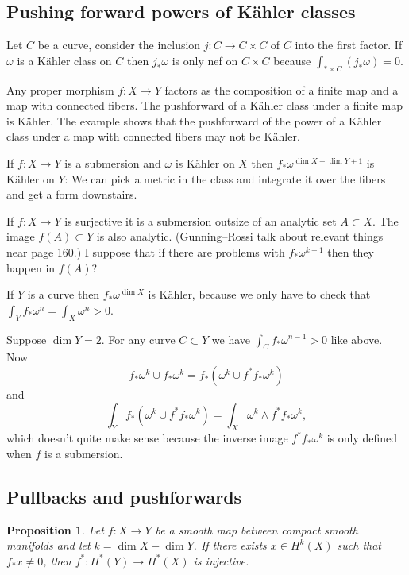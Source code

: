 \documentclass[11pt]{amsart}
\newtheorem{prop}[theo]{Proposition}
\theoremstyle{definition}
\begin{document}
\subsection*{Pushing forward powers of K\"ahler classes}

Let $C$ be a curve, consider the inclusion $j : C \to C \times C$ of $C$ into the first factor.
If $\omega$ is a K\"ahler class on $C$ then $j_*\omega$ is only nef on $C \times C$ because $\int_{* \times C} (j_*\omega) = 0$.

Any proper morphism $f : X \to Y$ factors as the composition of a finite map and a map with connected fibers.
The pushforward of a K\"ahler class under a finite map is K\"ahler.
The example shows that the pushforward of the power of a K\"ahler class under a map with connected fibers may not be K\"ahler.

If $f : X \to Y$ is a submersion and $\omega$ is K\"ahler on $X$ then $f_*\omega^{\dim X - \dim Y + 1}$ is K\"ahler on $Y$:
We can pick a metric in the class and integrate it over the fibers and get a form downstairs.

If $f : X \to Y$ is surjective it is a submersion outsize of an analytic set $A \subset X$.
The image $f(A) \subset Y$ is also analytic.
(Gunning--Rossi talk about relevant things near page 160.)
I suppose that if there are problems with $f_*\omega^{k+1}$ then they happen in $f(A)$?

If $Y$ is a curve then $f_*\omega^{\dim X}$ is K\"ahler, because we only have to check that $\int_Y f_* \omega^{n} = \int_X \omega^n > 0$.

Suppose $\dim Y = 2$.
For any curve $C \subset Y$ we have $\int_C f_*\omega^{n-1} > 0$ like above.
Now
\[
f_*\omega^{k} \cup f_*\omega^k
= f_*(\omega^k \cup f^*f_*\omega^k)
\]
and
\[
\int_Y f_*(\omega^k \cup f^*f_*\omega^k)
= \int_X \omega^k \wedge f^*f_*\omega^k,
\]
which doesn't quite make sense because the inverse image $f^*f_*\omega^k$ is only defined when $f$ is a submersion.



\subsection*{Pullbacks and pushforwards}


\begin{prop}
Let $f : X \to Y$ be a smooth map between compact smooth manifolds and let $k = \dim X - \dim Y$.
If there exists $x \in H^k(X)$ such that $f_* x \not= 0$, then $f^* : H^*(Y) \to H^*(X)$ is injective.
\end{prop}
\end{document}
